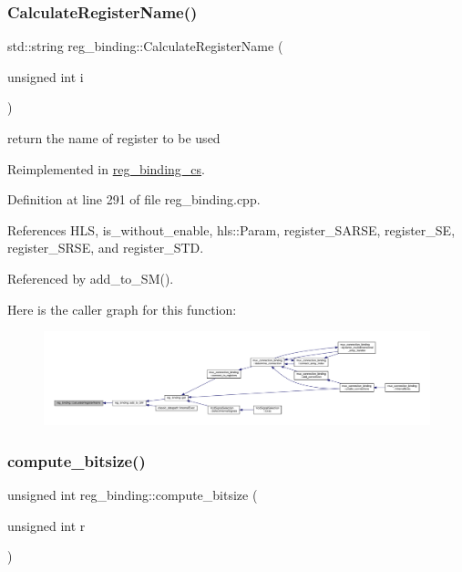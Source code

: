\subsubsection{\texorpdfstring{Calculate\+Register\+Name()}{CalculateRegisterName()}}
{\footnotesize\ttfamily std\+::string reg\+\_\+binding\+::\+Calculate\+Register\+Name (\begin{DoxyParamCaption}\item[{unsigned int}]{i }\end{DoxyParamCaption})\hspace{0.3cm}{\ttfamily [virtual]}}



return the name of register to be used 



Reimplemented in \hyperlink{classreg__binding__cs_a15bf6e04843ef122e38b1dfd8a118801}{reg\+\_\+binding\+\_\+cs}.



Definition at line 291 of file reg\+\_\+binding.\+cpp.



References H\+LS, is\+\_\+without\+\_\+enable, hls\+::\+Param, register\+\_\+\+S\+A\+R\+SE, register\+\_\+\+SE, register\+\_\+\+S\+R\+SE, and register\+\_\+\+S\+TD.



Referenced by add\+\_\+to\+\_\+\+S\+M().

Here is the caller graph for this function\+:
\nopagebreak
\begin{figure}[H]
\begin{center}
\leavevmode
\includegraphics[width=350pt]{da/d7c/classreg__binding_ae3ecd3a0314a97830ad0acd2568547c2_icgraph}
\end{center}
\end{figure}
\mbox{\label{classreg__binding_a697ec0dfee640bc2ef57c102a7a8c7a3}} 
\subsubsection{\texorpdfstring{compute\+\_\+bitsize()}{compute\_bitsize()}}
{\footnotesize\ttfamily unsigned int reg\+\_\+binding\+::compute\+\_\+bitsize (\begin{DoxyParamCaption}\item[{unsigned int}]{r }\end{DoxyParamCaption})\hspace{0.3cm}{\ttfamily [private]}}



